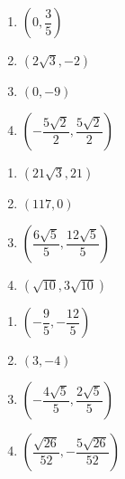 \begin{multicols}{4} 

\begin{enumerate}

\setcounter{enumi}{\value{HW}}

\item $\left( 0, \dfrac{3}{5} \right)$ 
\item $\left( 2\sqrt{3}, -2 \right)$ 
\item $\left( 0, -9 \right)$ 
\item $\left( -\dfrac{5\sqrt{2}}{2}, \dfrac{5\sqrt{2}}{2} \right)$

\setcounter{HW}{\value{enumi}}

\end{enumerate}

\end{multicols}

\begin{multicols}{4} 

\begin{enumerate}

\setcounter{enumi}{\value{HW}}

\item $\left( 21\sqrt{3}, 21 \right)$ 
\item $\left(117, 0 \right)$ 
\item $\left( \dfrac{6\sqrt{5}}{5}, \dfrac{12\sqrt{5}}{5} \right)$ 
\item $\left(\sqrt{10}, 3\sqrt{10} \right)$ 

\setcounter{HW}{\value{enumi}}

\end{enumerate}

\end{multicols}

\begin{multicols}{4} 

\begin{enumerate}

\setcounter{enumi}{\value{HW}}

\item $\left( -\dfrac{9}{5}, -\dfrac{12}{5} \right)$  
\item $\left( 3,-4 \right)$  
\item $\left( -\dfrac{4\sqrt{5}}{5}, \dfrac{2\sqrt{5}}{5} \right)$ 
\item $\left( \dfrac{\sqrt{26}}{52}, -\dfrac{5\sqrt{26}}{52} \right)$ 

\setcounter{HW}{\value{enumi}}

\end{enumerate}

\end{multicols}

